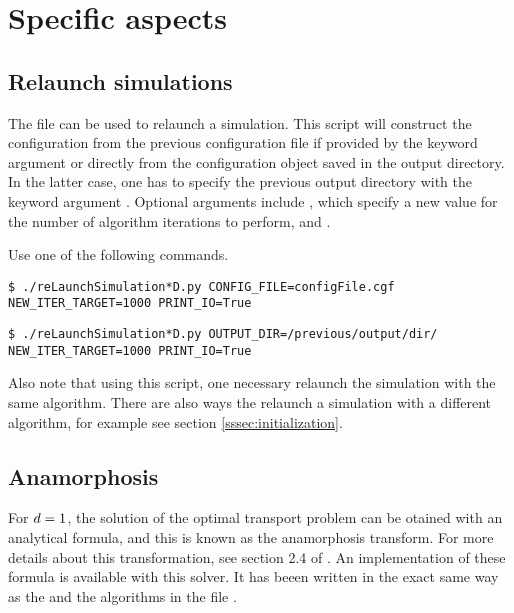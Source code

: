 
\section{Specific aspects}
\noindent
    
    \subsection{Relaunch simulations\label{sssec:relaunch-sim}}
    \noindent

        The \python file  can be used to relaunch a simulation. This script will construct
        the configuration from the previous configuration file if provided by the keyword argument 
        or directly from the configuration object saved in the output directory. In the latter case, one has to specify the
        previous output directory with the keyword argument . Optional arguments include
        , which specify a new value for the number of algorithm iterations to perform, and 
        .

        Use one of the following commands.
        \lstset{style=codebash}
        \begin{lstlisting}
$ ./reLaunchSimulation*D.py CONFIG_FILE=configFile.cgf NEW_ITER_TARGET=1000 PRINT_IO=True\end{lstlisting}
        \begin{lstlisting}
$ ./reLaunchSimulation*D.py OUTPUT_DIR=/previous/output/dir/ NEW_ITER_TARGET=1000 PRINT_IO=True\end{lstlisting}

        Also note that using this script, one necessary relaunch the simulation with the same algorithm. There are also ways
        the relaunch a simulation with a different algorithm, for example see section \ref{sssec:initialization}.

    \subsection{Anamorphosis\label{sssec:anamorphosis}}
    \noindent

        For $d=1$, the solution of the optimal transport problem can be otained with an analytical formula, and this
        is known as the anamorphosis transform. For more details about this transformation, see section 2.4 of .
        An implementation of these formula is available with this solver. It has beeen written in the exact same way as the
        \drAlgo{} and the \pdAlgo{} algorithms in the file .

